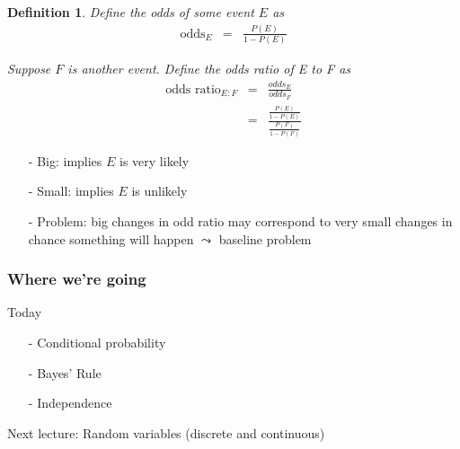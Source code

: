 \documentclass{beamer}
\newtheorem{defn}{Definition}
\numberwithin{equation}{section}
\begin{document}
\begin{frame}

\begin{defn}
Define the odds of some event $E$ as 
\begin{eqnarray}
\text{odds}_{E} & = & \frac{P(E)}{1 - P(E)} \nonumber 
\end{eqnarray}

Suppose $F$ is another event.  Define the \alert{odds ratio} of E to F as
\begin{eqnarray}
\text{odds ratio}_{E:F} & = & \frac{odds_{E}}{odds_{F}} \nonumber \\
& = & \frac{\frac{P(E)}{1-P(E)}}{\frac{P(F)}{1-P(F)}}\nonumber 
\end{eqnarray}


\end{defn}

\begin{itemize}
\item[-] Big: implies $E$ is very likely
\item[-] Small: implies $E$ is unlikely
\item[-] \alert{Problem}: big changes in odd ratio may correspond to very small changes in chance something will happen $\leadsto$ \alert{baseline problem}
\end{itemize}



\end{frame}






\begin{frame}
\frametitle{Where we're going} 

Today
\begin{itemize}
\item[-] Conditional probability 
\item[-] Bayes' Rule
\item[-] Independence 
\end{itemize}

Next lecture: Random variables (discrete and continuous)




\end{frame}
\end{document}
